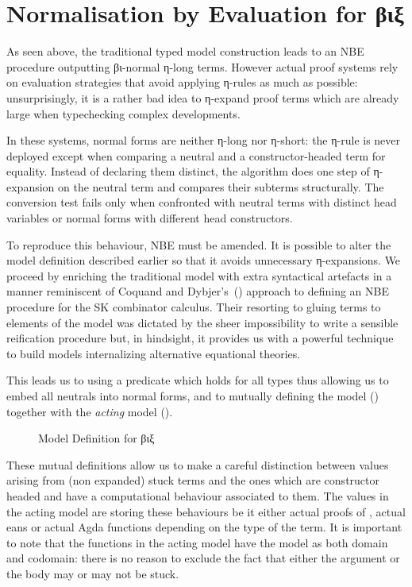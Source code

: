 \section{Normalisation by Evaluation for βιξ}

As seen above, the traditional typed model construction leads to an NBE
procedure outputting βι-normal η-long terms. However actual proof systems
rely on evaluation strategies that avoid applying η-rules
as much as possible: unsurprisingly, it is a rather bad idea to η-expand proof
terms which are already large when typechecking complex developments.

In these systems, normal forms are neither η-long nor η-short: the η-rule is
never deployed except when comparing a neutral and a constructor-headed term
for equality. Instead of declaring
them distinct, the algorithm does one step of η-expansion on the
neutral term and compares their subterms structurally. The conversion test
fails only when confronted with neutral terms with distinct head
variables or normal forms with different head constructors.

To reproduce this behaviour, NBE must be amended.
It is possible to alter the model definition described earlier so that it
avoids unnecessary η-expansions. We proceed by enriching the traditional
model with extra syntactical artefacts in a manner reminiscent of Coquand
and Dybjer's~(\citeyear{CoqDybSK}) approach to defining an NBE procedure for the SK combinator calculus. Their resorting to gluing
terms to elements of the model was dictated by the sheer impossibility to write
a sensible reification procedure but, in hindsight, it provides us with a
powerful technique to build models internalizing alternative equational
theories.

This leads us to using a predicate  which holds for all types thus allowing
us to embed all neutrals into normal forms, and to  mutually defining the model
() together with the \emph{acting} model ().

\begin{figure}[h]
\caption{Model Definition for βιξ\label{nbestuckmodel}}
\end{figure}

These mutual definitions allow us to make a careful distinction between values
arising from (non expanded) stuck terms and the ones which are constructor headed
and have a computational behaviour associated to them. The values in the acting
model are storing these behaviours be it either actual proofs of , actual
eans or actual Agda functions depending on the type of the term. It is
important to note that the functions in the acting model have the model as both
domain and codomain: there is no reason to exclude the fact that either the argument
or the body may or may not be stuck.

